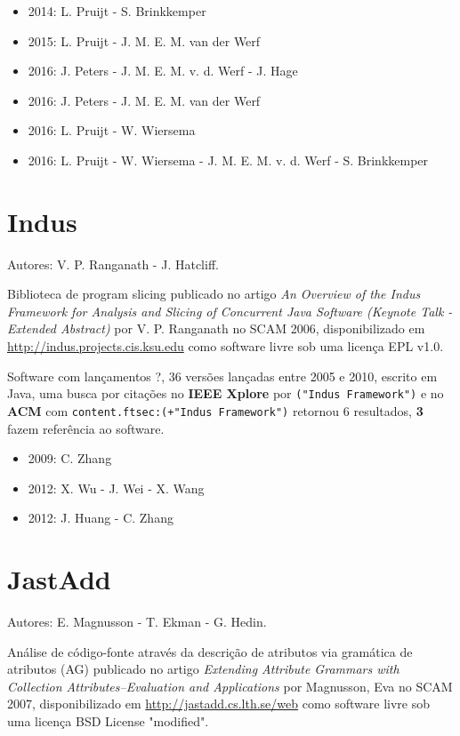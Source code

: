 \begin{itemize}
\item 2014: L. Pruijt - S. Brinkkemper
\item 2015: L. Pruijt - J. M. E. M. van der Werf
\item 2016: J. Peters - J. M. E. M. v. d. Werf - J. Hage
\item 2016: J. Peters - J. M. E. M. van der Werf
\item 2016: L. Pruijt - W. Wiersema
\item 2016: L. Pruijt - W. Wiersema - J. M. E. M. v. d. Werf - S. Brinkkemper
\end{itemize}

\section{Indus}

Autores:
V. P. Ranganath - J. Hatcliff.

Biblioteca de program slicing
publicado no artigo {\it An Overview of the Indus Framework for Analysis and Slicing of Concurrent Java Software (Keynote Talk - Extended Abstract)}
por V. P. Ranganath
no SCAM 2006,
disponibilizado em \url{http://indus.projects.cis.ksu.edu}
como software livre
sob uma licença EPL v1.0.

Software com lançamentos ?,
36 versões lançadas
entre 2005 e 2010,
escrito em Java,
uma busca por citações no {\bf IEEE Xplore} por
\texttt{("Indus Framework")}
e no {\bf ACM} com
\texttt{content.ftsec:(+"Indus Framework")}
retornou
6 resultados,
{\bf 3} fazem referência ao software.

\begin{itemize}
\item 2009: C. Zhang
\item 2012: X. Wu - J. Wei - X. Wang
\item 2012: J. Huang - C. Zhang
\end{itemize}

\section{JastAdd}

Autores:
E. Magnusson - T. Ekman - G. Hedin.

Análise de código-fonte através da descrição de atributos via gramática de atributos (AG)
publicado no artigo {\it Extending Attribute Grammars with Collection Attributes--Evaluation and Applications}
por Magnusson, Eva
no SCAM 2007,
disponibilizado em \url{http://jastadd.cs.lth.se/web}
como software livre
sob uma licença BSD License "modified".

